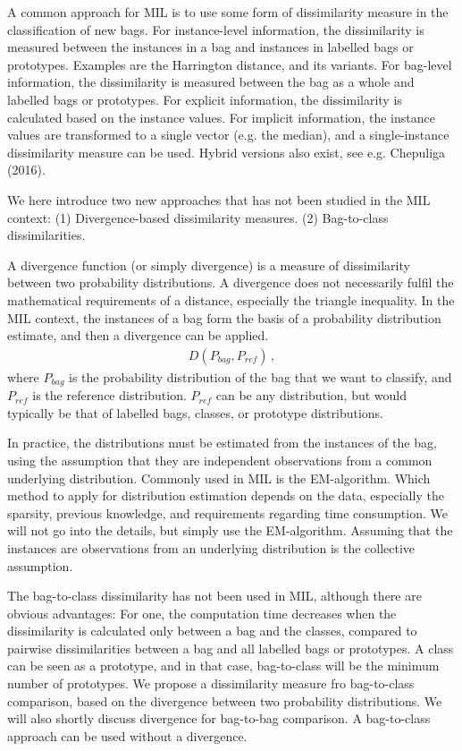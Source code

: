 A common approach for MIL is to use some form of dissimilarity measure in the classification of new bags. 
For instance-level information, the dissimilarity is measured between the instances in a bag and instances in labelled bags or prototypes. 
Examples are the Harrington distance, and its variants. 
For bag-level information, the dissimilarity is measured between the bag as a whole and labelled bags or prototypes. 
For explicit information, the dissimilarity is calculated based on the instance values.
For implicit information, the instance values are transformed to a single vector (e.g. the median), and a single-instance dissimilarity measure can be used. 
Hybrid versions also exist, see e.g. {\color{green} Chepuliga (2016)}. 

We here introduce two new approaches that has not been studied in the MIL context: 
(1) Divergence-based dissimilarity measures. 
(2) Bag-to-class dissimilarities. 

A divergence function (or simply divergence) is a measure of dissimilarity between two probability distributions.
A divergence does not necessarily fulfil the mathematical requirements of a distance, especially the triangle inequality. 
In the MIL context, the instances of a bag form the basis of a probability distribution estimate, and then a divergence can be applied. \\
\begin{align}
  D(P_{bag}, P_{ref})\, ,
\end{align}
where $P_{bag}$ is the probability distribution of the bag that we want to classify, and $P_{ref}$ is the reference distribution. 
$P_{ref}$ can be any distribution, but would typically be that of labelled bags, classes, or prototype distributions. 

In practice, the distributions must be estimated from the instances of the bag, using the assumption that they are independent observations from a common underlying distribution. 
Commonly used in MIL is the EM-algorithm.
Which method to apply for distribution estimation depends on the data, especially the sparsity, previous knowledge, and requirements regarding time consumption. 
We will not go into the details, but simply use the EM-algorithm.
Assuming that the instances are observations from an underlying distribution is the collective assumption. 

The bag-to-class dissimilarity has not been used in MIL, although there are obvious advantages:
For one, the computation time decreases when the dissimilarity is calculated only between a bag and the classes, compared to pairwise dissimilarities between a bag and all labelled bags or prototypes. 
A class can be seen as a prototype, and in that case, bag-to-class will be the minimum number of prototypes. 
We propose a dissimilarity measure fro bag-to-class comparison, based on the divergence between two probability distributions. 
We will also shortly discuss divergence for bag-to-bag comparison. 
A bag-to-class approach can be used without a divergence. 

